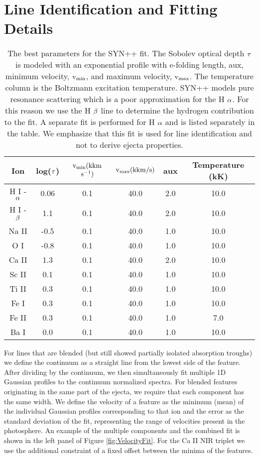 \documentclass[a4paper,fleqn,usenatbib]{mnras}
\begin{document}
\section{Line Identification and Fitting Details}\label{AppLineFit}
\begin{table*}
\caption{The best parameters for the SYN++ fit. 
The Sobolev optical depth $\rm{\tau}$ is modeled with an exponential profile with e-folding length, aux, minimum velocity, $\rm{v_{min}}$, and maximum velocity, $\rm{v_{max}}$. 
The temperature column is the Boltzmann excitation temperature.
SYN++ models pure resonance scattering which is a poor approximation for the H $\rm{\alpha}$. 
For this reason we use the H $\rm{\beta}$ line to determine the hydrogen contribution to the fit.
A separate fit is performed for H $\rm{\alpha}$ and is listed separately in the table.
We emphasize that this fit is used for line identification and not to derive ejecta properties.}
\begin{center}
\begin{tabular}{c|c|c|c|c|c}
\hline
Ion & log($\rm{\tau}$) & $\rm{v_{min}(kkm}$ $\rm{s^{-1})}$ & $\rm{v_{max}(kkm/s)}$ & aux & Temperature (kK) \\
\hline
  H I -$\rm{\alpha}$   & 0.06 & 0.1 & 40.0 & 2.0 & 10.0 \\
  H I - $\rm{\beta}$   & 1.1& 0.1 & 40.0 & 2.0 & 10.0 \\
  Na II & -0.5 & 0.1 & 40.0 & 1.0 & 10.0 \\
  O I & -0.8 & 0.1 & 40.0 & 1.0 & 10.0 \\
  Ca II & 1.3 & 0.1 & 40.0 & 2.0 & 10.0 \\
  Sc II & 0.1 & 0.1 & 40.0 & 1.0 & 10.0 \\
  Ti II  & 0.3 & 0.1 & 40.0 & 1.0 & 10.0 \\
  Fe I  &  0.3 & 0.1 & 40.0 & 1.0 & 10.0 \\
  Fe II & 0.3 & 0.1 & 40.0 & 1.0 & 7.0 \\
  Ba I & 0.0 & 0.1 & 40.0 & 1.0 & 10.0 \\  
  \hline
 \end{tabular}
\end{center}
\label{tab:syn++}
\end{table*}

For lines that are blended (but still showed partially isolated absorption troughs) we define the continuum as a straight line from the lowest side of the feature. 
After dividing by the continuum, we then simultaneously fit multiple 1D Gaussian profiles to the continuum normalized spectra. 
For blended features originating in the same part of the ejecta, we require that each component has the same width.
We define the velocity of a feature as the minimum (mean) of the individual Gaussian profiles corresponding to that ion and the error as the standard deviation of the fit, representing the range of velocities present in the photosphere. 
An example of the multiple components and the combined fit is shown in the left panel of Figure \ref{fig:VelocityFit}.
For the Ca II NIR triplet we use the additional constraint of a fixed offset between the minima of the features. 
\end{document}
